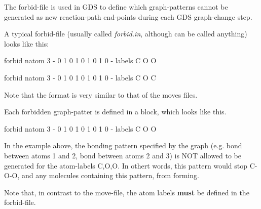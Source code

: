 The forbid-\/file is used in G\+DS to define which graph-\/patterns cannot be generated as new reaction-\/path end-\/points during each G\+DS graph-\/change step.

A typical forbid-\/file (usually called {\itshape forbid.\+in}, although can be called anything) looks like this\+: \begin{DoxyVerb}forbid
natom 3
-
0 1 0
1 0 1
0 1 0
-
labels C O O

forbid
natom 3
-
0 1 0
1 0 1
0 1 0
-
labels C O C
\end{DoxyVerb}


Note that the format is very similar to that of the moves files.

Each forbidden graph-\/patter is defined in a block, which looks like this. \begin{DoxyVerb}forbid  
natom 3
-
0 1 0
1 0 1
    0 1 0
-
labels C O O
\end{DoxyVerb}


In the example above, the bonding pattern specified by the graph (e.\+g. bond between atoms 1 and 2, bond between atoms 2 and 3) is N\+OT allowed to be generated for the atom-\/labels C,O,O. In othert words, this pattern would stop C-\/\+O-\/O, and any molecules containing this pattern, from forming.

Note that, in contrast to the move-\/file, the atom labels {\bfseries{must}} be defined in the forbid-\/file. 